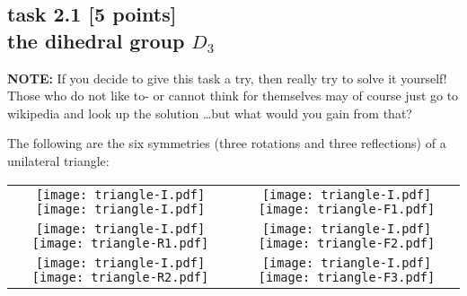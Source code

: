 
\subsection*{task 2.1 [5 points] \\[1ex] the dihedral group $D_3$}

\textbf{NOTE:} If you decide to give this task a try, then really try to solve it yourself! Those who do not like to- or cannot think for themselves may of course just go to wikipedia and look up the solution \ldots but what would you gain from that? 

The following are the six symmetries (three rotations and three reflections) of a unilateral triangle:

\begin{center}
\begin{tabular}{cc}
\texttt{[image: triangle-I.pdf]} \raisebox{2ex}{$\stackrel{I}{\rightarrow}$} \texttt{[image: triangle-I.pdf]} \qquad
& \qquad \texttt{[image: triangle-I.pdf]} \raisebox{2ex}{$\stackrel{F_1}{\rightarrow}$} \texttt{[image: triangle-F1.pdf]} \\

\texttt{[image: triangle-I.pdf]} \raisebox{2ex}{$\stackrel{R_1}{\rightarrow}$} \texttt{[image: triangle-R1.pdf]} \qquad
& \qquad \texttt{[image: triangle-I.pdf]} \raisebox{2ex}{$\stackrel{F_2}{\rightarrow}$} \texttt{[image: triangle-F2.pdf]} \\

\texttt{[image: triangle-I.pdf]} \raisebox{2ex}{$\stackrel{R_2}{\rightarrow}$} \texttt{[image: triangle-R2.pdf]} \qquad
& \qquad \texttt{[image: triangle-I.pdf]} \raisebox{2ex}{$\stackrel{F_3}{\rightarrow}$} \texttt{[image: triangle-F3.pdf]}
\end{tabular}
\end{center}

